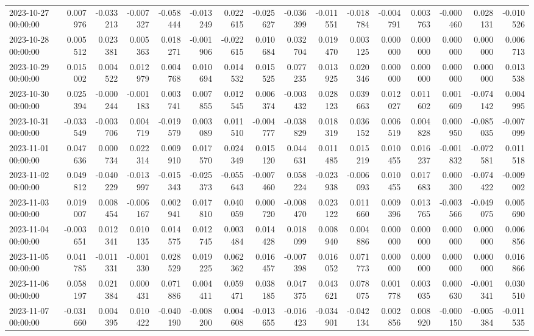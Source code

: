 \begin{tabular}{lrrrrrrrrrrrrrrr}
2023-10-27 00:00:00 & 0.007976 & -0.033213 & -0.007327 & -0.058444 & -0.013249 & 0.022615 & -0.025627 & -0.036399 & -0.011551 & -0.018784 & -0.004791 & 0.003763 & -0.000460 & 0.028131 & -0.010526 \\
2023-10-28 00:00:00 & 0.005512 & 0.023381 & 0.005363 & 0.018271 & -0.001906 & -0.022615 & 0.010684 & 0.032704 & 0.019470 & 0.003125 & 0.000000 & 0.000000 & 0.000000 & 0.000000 & 0.006713 \\
2023-10-29 00:00:00 & 0.015002 & 0.004522 & 0.012979 & 0.004768 & 0.010694 & 0.014532 & 0.015525 & 0.077235 & 0.013925 & 0.020346 & 0.000000 & 0.000000 & 0.000000 & 0.000000 & 0.013538 \\
2023-10-30 00:00:00 & 0.025394 & -0.000244 & -0.001183 & 0.003741 & 0.007855 & 0.012545 & 0.006374 & -0.003432 & 0.028123 & 0.039663 & 0.012027 & 0.011602 & 0.001609 & -0.074142 & 0.004995 \\
2023-10-31 00:00:00 & -0.033549 & -0.003706 & 0.004719 & -0.019579 & 0.003089 & 0.011510 & -0.004777 & -0.038829 & 0.018319 & 0.036152 & 0.006519 & 0.004828 & 0.000950 & -0.085035 & -0.007099 \\
2023-11-01 00:00:00 & 0.047636 & 0.000734 & 0.022314 & 0.009910 & 0.017570 & 0.024349 & 0.015120 & 0.044631 & 0.011485 & 0.015219 & 0.010455 & 0.016237 & -0.001832 & -0.072581 & 0.011518 \\
2023-11-02 00:00:00 & 0.049812 & -0.040229 & -0.013997 & -0.015343 & -0.025373 & -0.055643 & -0.007460 & 0.058224 & -0.023938 & -0.006093 & 0.010455 & 0.017683 & 0.000300 & -0.074422 & -0.009002 \\
2023-11-03 00:00:00 & 0.019007 & 0.008454 & -0.006167 & 0.002941 & 0.017810 & 0.040059 & 0.000720 & -0.008470 & 0.023122 & 0.011660 & 0.009396 & 0.013765 & -0.003566 & -0.049075 & 0.005690 \\
2023-11-04 00:00:00 & -0.003651 & 0.012341 & 0.010135 & 0.014575 & 0.012745 & 0.003484 & 0.014428 & 0.018099 & 0.008940 & 0.004886 & 0.000000 & 0.000000 & 0.000000 & 0.000000 & 0.006856 \\
2023-11-05 00:00:00 & 0.041785 & -0.011331 & -0.001330 & 0.028529 & 0.019225 & 0.062362 & 0.016457 & -0.007398 & 0.016052 & 0.071773 & 0.000000 & 0.000000 & 0.000000 & 0.000000 & 0.016866 \\
2023-11-06 00:00:00 & 0.058197 & 0.021384 & 0.000431 & 0.071886 & 0.004411 & 0.059471 & 0.038185 & 0.047375 & 0.043621 & 0.078075 & 0.001778 & 0.003035 & 0.000630 & -0.001341 & 0.030510 \\
2023-11-07 00:00:00 & -0.031660 & 0.004395 & 0.010422 & -0.040190 & -0.008200 & 0.004608 & -0.013655 & -0.016423 & -0.034901 & -0.042134 & 0.002856 & 0.008920 & -0.000150 & -0.005384 & -0.011535 \\

\end{tabular}
